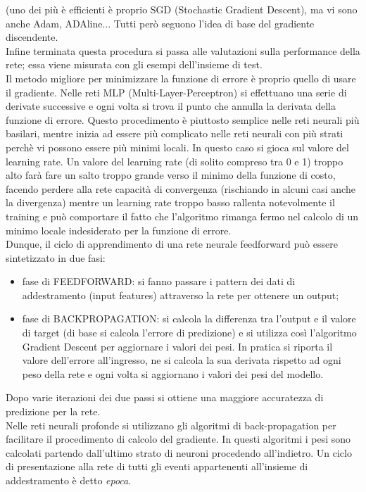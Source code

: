  (uno dei più è efficienti è proprio SGD (Stochastic Gradient Descent), ma vi sono anche Adam, ADAline... 
 Tutti però seguono l’idea di base del gradiente discendente.\\ 
 Infine terminata questa procedura si passa alle valutazioni sulla performance della rete;
  essa viene misurata con gli esempi dell’insieme di test.\\
 Il metodo migliore per minimizzare la funzione di errore è proprio quello di usare il gradiente.
 Nelle reti MLP (Multi-Layer-Perceptron) si effettuano una serie di derivate successive e
  ogni volta si trova il punto che annulla la derivata della funzione di errore. Questo procedimento è 
  piuttosto semplice nelle reti neurali più basilari, mentre inizia ad essere più complicato
   nelle reti neurali con più strati perchè vi possono essere più minimi locali. In questo caso si gioca sul valore del learning rate.
   Un valore del learning rate (di solito compreso tra 0 e 1) troppo alto farà fare un
    salto troppo grande verso il minimo della funzione di costo, 
   facendo perdere alla rete capacità di convergenza (rischiando in alcuni casi anche la divergenza) mentre un learning rate troppo basso rallenta
    notevolmente il training e può comportare il fatto che l'algoritmo rimanga fermo nel 
    calcolo di un minimo locale indesiderato per la funzione di errore. \\
   

Dunque, il ciclo di apprendimento di una rete neurale feedforward può essere sintetizzato in due fasi:
\begin{itemize}
\item fase di FEEDFORWARD: si fanno passare i pattern dei dati di addestramento (input features) 
attraverso la rete per ottenere un output;\\
\item fase di BACKPROPAGATION: si calcola la differenza tra l'output e il valore di
  target (di base si calcola l’errore di predizione) e si utilizza così l’algoritmo Gradient Descent 
  per aggiornare i valori dei pesi. In pratica si riporta il valore dell’errore all’ingresso, 
  ne si calcola la sua derivata rispetto ad ogni peso della rete e ogni volta si aggiornano i
   valori dei pesi del modello. 
\end{itemize}
 Dopo varie iterazioni dei due passi si ottiene una maggiore accuratezza di predizione per la rete. \\ 
 Nelle reti neurali profonde si utilizzano gli algoritmi di 
 back-propagation per facilitare il procedimento di calcolo del gradiente. In questi algoritmi
  i pesi sono calcolati partendo dall’ultimo strato di neuroni procedendo all’indietro.
   Un ciclo di presentazione alla rete di tutti gli eventi appartenenti all’insieme di 
   addestramento è detto \emph{epoca}. \\
 
